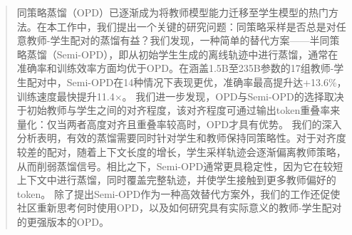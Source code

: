 \begin{abstract}
同策略蒸馏（OPD）已逐渐成为将教师模型能力迁移至学生模型的热门方法。在本工作中，我们提出一个关键的研究问题：同策略采样是否总是对任意教师-学生配对的蒸馏有益？我们发现，一种简单的替代方案——半同策略蒸馏（Semi-OPD），即从初始学生生成的离线轨迹中进行蒸馏，通常在准确率和训练效率方面均优于OPD。在涵盖1.5B至235B参数的17组教师-学生配对中，Semi-OPD在14种情况下表现更优，准确率最高提升达+13.6\%，训练速度最快提升11.4$\times$。  
我们进一步发现，OPD与Semi-OPD的选择取决于初始教师与学生之间的对齐程度，该对齐程度可通过输出token重叠率来量化：仅当两者高度对齐且重叠率较高时，OPD才具有优势。  
我们的深入分析表明，有效的蒸馏需要同时针对学生和教师保持同策略性。对于对齐度较差的配对，随着上下文长度的增长，学生采样轨迹会逐渐偏离教师策略，从而削弱蒸馏信号。相比之下，Semi-OPD通常更具稳定性，因为它在较短上下文中进行蒸馏，同时覆盖完整轨迹，并使学生接触到更多教师偏好的token。  
除了提出Semi-OPD作为一种高效替代方案外，我们的工作还促使社区重新思考何时使用OPD，以及如何研究具有实际意义的教师-学生配对的更强版本的OPD。


\end{abstract}

